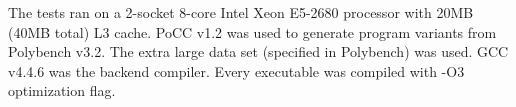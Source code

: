 The tests ran on a 2-socket 8-core Intel Xeon E5-2680 processor with 20MB (40MB total) L3 cache.
PoCC v1.2 was used to generate program variants from Polybench v3.2.
The extra large data set (specified in Polybench) was used. 
GCC v4.4.6 was the backend compiler. Every executable was compiled with
-O3 optimization flag.


